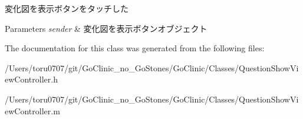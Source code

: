 \label{interface_question_show_view_controller_a0ec37f9f15052ef586da0426bc38c891}
変化図を表示ボタンをタッチした 
\begin{DoxyParams}{Parameters}
{\em sender} & 変化図を表示ボタンオブジェクト \\
\hline
\end{DoxyParams}


The documentation for this class was generated from the following files:\begin{DoxyCompactItemize}
\item 
/Users/toru0707/git/GoClinic\_\-no\_\-GoStones/GoClinic/Classes/QuestionShowViewController.h\item 
/Users/toru0707/git/GoClinic\_\-no\_\-GoStones/GoClinic/Classes/QuestionShowViewController.m\end{DoxyCompactItemize}
